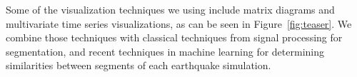 Some of the visualization techniques we using include matrix diagrams and multivariate time series visualizations, as can be seen in Figure~\ref{fig:teaser}. We combine those techniques with classical techniques from signal processing for segmentation, and recent techniques in machine learning for determining similarities between segments of each earthquake simulation.





